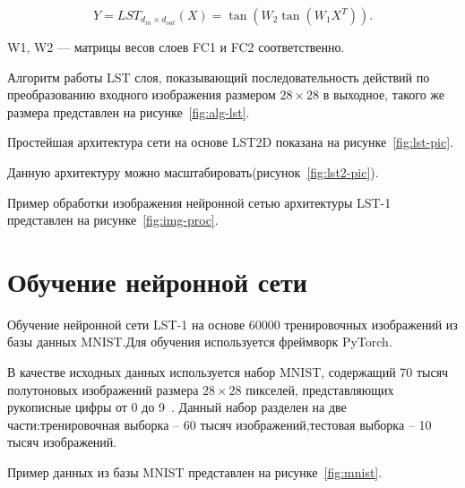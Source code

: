 \begin{equation}
  Y = LST_{d_{in}\times d_{out}}(X) = \tan(W_2\tan(W_1X^T)).
\end{equation}

 W1, W2 — матрицы весов слоев FC1 и FC2 соответственно.

Алгоритм работы LST слоя, показывающий последовательность действий по преобразованию
входного изображения размером \(28\times28\) в выходное, такого же размера 
представлен на рисунке~\ref{fig:alg-lst}. 


Простейшая архитектура сети на основе LST2D показана на 
рисунке~\ref{fig:lst-pic}\cite{LST2D}. 


Данную архитектуру можно масштабировать(рисунок~\ref{fig:lst2-pic}\cite{LST2D}).


Пример обработки изображения нейронной сетью архитектуры LST-1 представлен на 
рисунке~\ref{fig:img-proc}\cite{LST2D}.


\section{Обучение нейронной сети}
\hspace*{12.5 mm}Обучение нейронной сети LST-1 на основе 60000 тренировочных 
изображений из базы данных MNIST.\@ Для обучения используется фреймворк 
PyTorch.\@

В качестве исходных данных используется набор MNIST, 
содержащий 70 тысяч полутоновых изображений размера $28 \times 28$ пикселей, 
представляющих рукописные цифры от 0 до 9~\cite{MNIST}. Данный набор разделен 
на две части:тренировочная выборка – 60 тысяч изображений,тестовая 
выборка – 10 тысяч изображений.

  Пример данных из базы MNIST представлен на рисунке~\ref{fig:mnist}.


